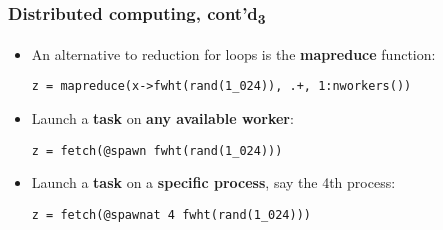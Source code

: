 \documentclass[t,usepdftitle=false]{beamer}
\begin{document}
\begin{frame}[fragile]
\frametitle{Distributed computing, cont'd\textsubscript{3}}
\begin{itemize}
\item An alternative to reduction for loops is the \textbf{mapreduce} function:
\begin{verbatim}
z = mapreduce(x->fwht(rand(1_024)), .+, 1:nworkers())
\end{verbatim}
\item Launch a \textbf{task} on \textbf{any available worker}:
\begin{verbatim}
z = fetch(@spawn fwht(rand(1_024)))
\end{verbatim}
\item Launch a \textbf{task} on a \textbf{specific process}, say the 4th process:
\begin{verbatim}
z = fetch(@spawnat 4 fwht(rand(1_024)))
\end{verbatim}
\end{itemize}
\end{frame}
\end{document}
